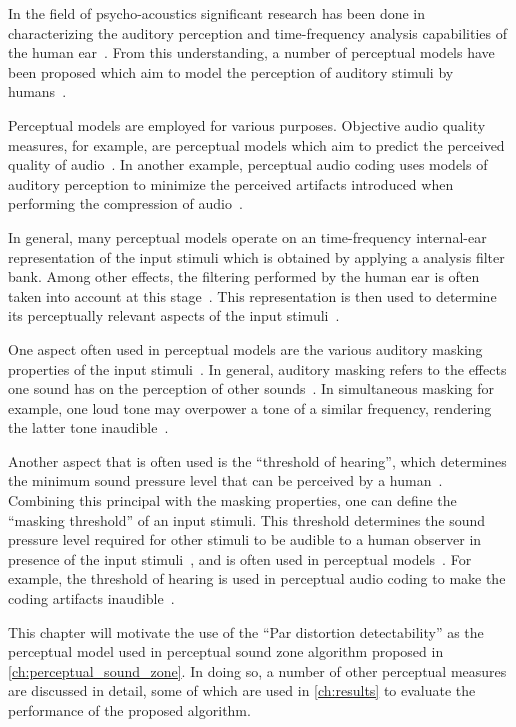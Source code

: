 In the field of psycho-acoustics significant research has been done in characterizing the auditory 
perception and time-frequency
analysis capabilities of the human ear~\cite{painter2000perceptual}.
From this understanding, a number of perceptual models have been proposed which aim to model the 
perception of auditory stimuli by humans~\cite{van2005perceptual}.

Perceptual models are employed for various purposes.
Objective audio quality measures, for example, are perceptual models which aim to predict the 
perceived quality of audio~\cite{torcoli2021objective}.
In another example, perceptual audio coding uses models of auditory perception to minimize the perceived artifacts introduced when
performing the compression of audio~\cite{herre2019psychoacoustic}.

In general, many perceptual models operate on an time-frequency internal-ear representation of the input stimuli which is obtained by applying a 
analysis filter bank. 
Among other effects, the filtering performed by the human ear is often taken 
into account at this stage~\cite{van2005perceptual, taal2012low}.
This representation is then used to determine its perceptually relevant aspects 
of the input stimuli~\cite{herre2019psychoacoustic}.

One aspect often used in perceptual models are the various auditory masking properties of the 
input stimuli~\cite{herre2019psychoacoustic}.
In general, auditory masking refers to the effects one sound has on the perception of other sounds~\cite{painter2000perceptual}.
In simultaneous masking for example, one loud tone may overpower a tone of a similar frequency, rendering the 
latter tone inaudible~\cite{painter2000perceptual}.

Another aspect that is often used is the ``threshold of hearing'', which determines the minimum sound pressure level 
that can be perceived by a human~\cite{herre2019psychoacoustic}.
Combining this principal with the masking properties, one can define the ``masking threshold'' of an input stimuli.
This threshold determines the sound pressure level required for other stimuli to be audible to a human observer in presence 
of the input stimuli~\cite{painter2000perceptual}, and is often used in perceptual 
models~\cite{van2005perceptual, taal2012low}. 
For example, the threshold of hearing is used in perceptual audio coding to 
make the coding artifacts inaudible~\cite{herre2019psychoacoustic}.

This chapter will motivate the use of the ``Par distortion detectability'' as the perceptual model used in 
perceptual sound zone algorithm proposed in \autoref{ch:perceptual_sound_zone}.
In doing so, a number of other perceptual measures are discussed in detail, some of which are used 
in \autoref{ch:results} to evaluate the performance of the proposed algorithm.

